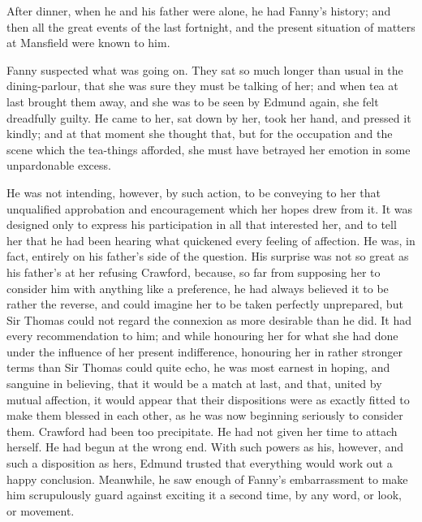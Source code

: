 \documentclass{article}
\begin{document}
After dinner, when he and his father were alone,
he had Fanny's history; and then all the great events
of the last fortnight, and the present situation
of matters at Mansfield were known to him.

Fanny suspected what was going on.  They sat so much
longer than usual in the dining-parlour, that she was sure
they must be talking of her; and when tea at last brought
them away, and she was to be seen by Edmund again, she felt
dreadfully guilty.  He came to her, sat down by her,
took her hand, and pressed it kindly; and at that moment
she thought that, but for the occupation and the scene
which the tea-things afforded, she must have betrayed
her emotion in some unpardonable excess.

He was not intending, however, by such action,
to be conveying to her that unqualified approbation
and encouragement which her hopes drew from it.
It was designed only to express his participation in all
that interested her, and to tell her that he had been
hearing what quickened every feeling of affection.  He was,
in fact, entirely on his father's side of the question.
His surprise was not so great as his father's at her
refusing Crawford, because, so far from supposing
her to consider him with anything like a preference,
he had always believed it to be rather the reverse,
and could imagine her to be taken perfectly unprepared,
but Sir Thomas could not regard the connexion as more
desirable than he did.  It had every recommendation to him;
and while honouring her for what she had done under the
influence of her present indifference, honouring her in
rather stronger terms than Sir Thomas could quite echo,
he was most earnest in hoping, and sanguine in believing,
that it would be a match at last, and that, united by
mutual affection, it would appear that their dispositions
were as exactly fitted to make them blessed in each other,
as he was now beginning seriously to consider them.
Crawford had been too precipitate.  He had not given her
time to attach herself.  He had begun at the wrong end.
With such powers as his, however, and such a disposition
as hers, Edmund trusted that everything would work
out a happy conclusion.  Meanwhile, he saw enough
of Fanny's embarrassment to make him scrupulously guard
against exciting it a second time, by any word, or look,
or movement.
\end{document}
